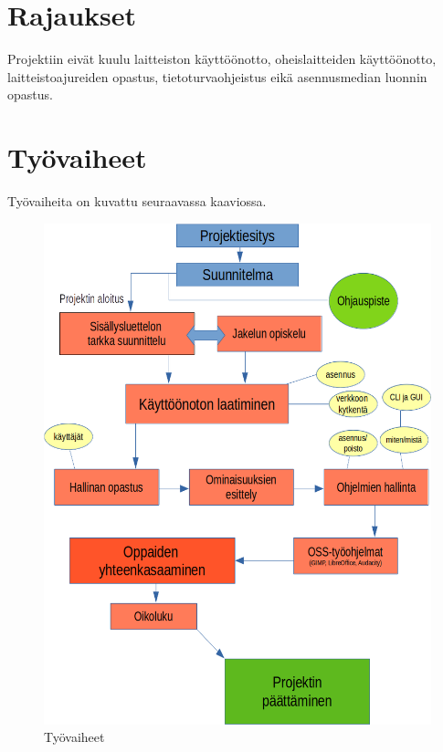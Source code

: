 \documentclass[a4paper, 12pt, finnish]{article}
\begin{document}
\section{Rajaukset}
Projektiin eivät kuulu laitteiston käyttöönotto, oheislaitteiden käyttöönotto, laitteistoajureiden opastus, tietoturvaohjeistus eikä asennusmedian luonnin opastus.
\section{Työvaiheet}
Työvaiheita on kuvattu seuraavassa kaaviossa.
\begin{figure}[!htpb]
    \centering
    \includegraphics[width=\textwidth]{kaaviokuva}
    \caption{Työvaiheet}
    \label{}
\end{figure}
\end{document}
